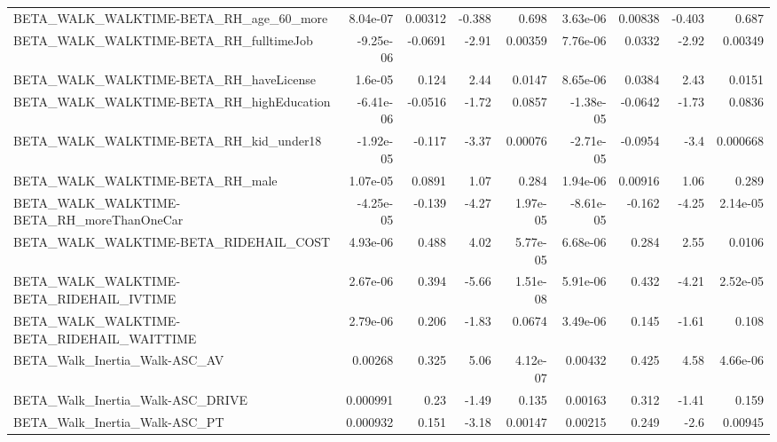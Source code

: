 \begin{tabular}{lrrrrrrrr}
BETA\_WALK\_WALKTIME-BETA\_RH\_age\_60\_more             &    8.04e-07 &      0.00312 &   -0.388 &    0.698 &   3.63e-06 &     0.00838 &       -0.403 &         0.687 \\
BETA\_WALK\_WALKTIME-BETA\_RH\_fulltimeJob             &   -9.25e-06 &      -0.0691 &    -2.91 &  0.00359 &   7.76e-06 &      0.0332 &        -2.92 &       0.00349 \\
BETA\_WALK\_WALKTIME-BETA\_RH\_haveLicense             &     1.6e-05 &        0.124 &     2.44 &   0.0147 &   8.65e-06 &      0.0384 &         2.43 &        0.0151 \\
BETA\_WALK\_WALKTIME-BETA\_RH\_highEducation           &   -6.41e-06 &      -0.0516 &    -1.72 &   0.0857 &  -1.38e-05 &     -0.0642 &        -1.73 &        0.0836 \\
BETA\_WALK\_WALKTIME-BETA\_RH\_kid\_under18             &   -1.92e-05 &       -0.117 &    -3.37 &  0.00076 &  -2.71e-05 &     -0.0954 &         -3.4 &      0.000668 \\
BETA\_WALK\_WALKTIME-BETA\_RH\_male                    &    1.07e-05 &       0.0891 &     1.07 &    0.284 &   1.94e-06 &     0.00916 &         1.06 &         0.289 \\
BETA\_WALK\_WALKTIME-BETA\_RH\_moreThanOneCar          &   -4.25e-05 &       -0.139 &    -4.27 & 1.97e-05 &  -8.61e-05 &      -0.162 &        -4.25 &      2.14e-05 \\
BETA\_WALK\_WALKTIME-BETA\_RIDEHAIL\_COST              &    4.93e-06 &        0.488 &     4.02 & 5.77e-05 &   6.68e-06 &       0.284 &         2.55 &        0.0106 \\
BETA\_WALK\_WALKTIME-BETA\_RIDEHAIL\_IVTIME            &    2.67e-06 &        0.394 &    -5.66 & 1.51e-08 &   5.91e-06 &       0.432 &        -4.21 &      2.52e-05 \\
BETA\_WALK\_WALKTIME-BETA\_RIDEHAIL\_WAITTIME          &    2.79e-06 &        0.206 &    -1.83 &   0.0674 &   3.49e-06 &       0.145 &        -1.61 &         0.108 \\
BETA\_Walk\_Inertia\_Walk-ASC\_AV                      &     0.00268 &        0.325 &     5.06 & 4.12e-07 &    0.00432 &       0.425 &         4.58 &      4.66e-06 \\
BETA\_Walk\_Inertia\_Walk-ASC\_DRIVE                   &    0.000991 &         0.23 &    -1.49 &    0.135 &    0.00163 &       0.312 &        -1.41 &         0.159 \\
BETA\_Walk\_Inertia\_Walk-ASC\_PT                      &    0.000932 &        0.151 &    -3.18 &  0.00147 &    0.00215 &       0.249 &         -2.6 &       0.00945 \\

\end{tabular}
